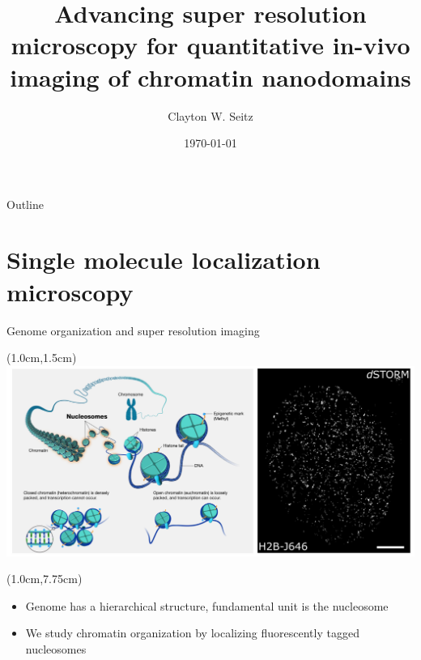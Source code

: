 \documentclass{beamer}					%
\title{Advancing super resolution microscopy for quantitative in-vivo imaging of chromatin nanodomains}	%
\author{Clayton W. Seitz}								%
\date{\today}									%
\begin{document}
\begin{frame}
  \titlepage
\end{frame}

\begin{frame}{Outline}
    \tableofcontents
\end{frame}



%




\section{Single molecule localization microscopy}

\begin{frame}{Genome organization and super resolution imaging}
\begin{textblock*}{13cm}(1.0cm,1.5cm)
\includegraphics[width=\textwidth]{Intro2}
\end{textblock*}
\begin{textblock*}{\textwidth}(1.0cm,7.75cm)
\begin{itemize}
\item Genome has a hierarchical structure, fundamental unit is the nucleosome
\item We study chromatin organization by localizing fluorescently tagged nucleosomes
\end{itemize}
\end{textblock*}

\end{frame}
\end{document}
